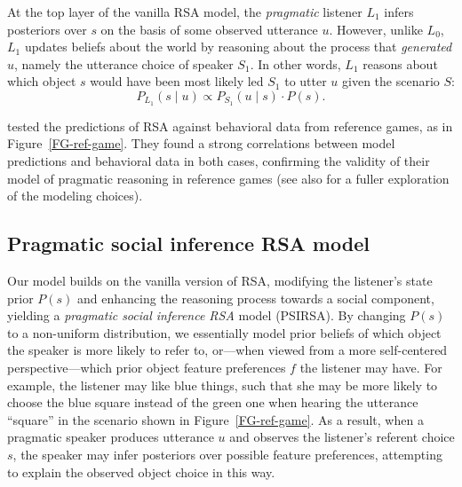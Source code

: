 \documentclass[10pt,a4paper]{article}
\begin{document}
At the top layer of the vanilla RSA model, the \emph{pragmatic} listener $L_1$ infers posteriors over $s$ on the basis of some observed utterance $u$.
However, unlike $L_0$, $L_1$ updates beliefs about the world by reasoning about the process that \emph{generated} $u$, namely the utterance choice of speaker $S_1$.
In other words, $L_1$ reasons about which object $s$ would have been most likely led $S_1$ to utter $u$ given the scenario $S$:
\begin{equation}
P_{L_{1}}(s \mid u) \propto P_{S_{1}}(u \mid s) \cdot P(s).
\end{equation}


 tested the predictions of RSA against behavioral data from reference games, as in Figure~\ref{FG-ref-game}.
They found a strong correlations between model predictions and behavioral data in both cases, confirming the validity of their model of pragmatic reasoning in reference games (see also  for a fuller exploration of the modeling choices).


\subsection{Pragmatic social inference RSA model}

Our model builds on the vanilla version of RSA, modifying the listener's state prior $P(s)$ and enhancing the reasoning process towards a social component, yielding a \emph{pragmatic social inference RSA} model (PSIRSA). %
By changing $P(s)$ to a non-uniform distribution, we essentially model prior beliefs of which object the speaker is more likely to refer to, or---when viewed from a more self-centered perspective---which prior object feature preferences $f$ the listener may have. 
For example, the listener may like blue things, such that she may be more likely to choose the blue square instead of the green one when hearing the utterance ``square'' in the scenario shown in Figure~\ref{FG-ref-game}.
As a result, when a pragmatic speaker produces utterance $u$ and observes the listener's referent choice $s$, the speaker may infer posteriors over possible feature preferences, attempting to explain the observed object choice in this way.
\end{document}
